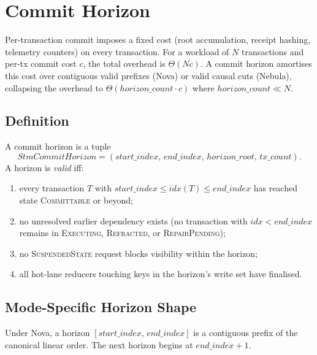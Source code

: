 \section{Commit Horizon}

\label{sec:horizon}

Per-transaction commit imposes a fixed cost (root accumulation,
receipt hashing, telemetry counters) on every transaction. For a
workload of $N$ transactions and per-tx commit cost $c$, the total
overhead is $\Theta(Nc)$. A commit horizon amortises this cost over
contiguous valid prefixes (Nova) or valid causal cuts (Nebula),
collapsing the overhead to $\Theta(\mathit{horizon\_count} \cdot c)$
where $\mathit{horizon\_count} \ll N$.

\subsection{Definition}

\begin{definition}
\label{def:commit-horizon}
A commit horizon is a tuple
\[
\mathit{StmCommitHorizon} =
(\mathit{start\_index},\, \mathit{end\_index},\,
 \mathit{horizon\_root},\, \mathit{tx\_count}).
\]
A horizon is \emph{valid} iff:
\begin{enumerate}[leftmargin=2em,nosep]
\item every transaction $T$ with $\mathit{start\_index} \leq
      \mathit{idx}(T) \leq \mathit{end\_index}$ has reached state
      \textsc{Committable} or beyond;
\item no unresolved earlier dependency exists (no transaction with
      $\mathit{idx} < \mathit{end\_index}$ remains in
      \textsc{Executing}, \textsc{Refracted}, or
      \textsc{RepairPending});
\item no \textsc{SuspendedState} request blocks visibility within
      the horizon;
\item all hot-lane reducers touching keys in the horizon's write set
      have finalised.
\end{enumerate}
\end{definition}

\subsection{Mode-Specific Horizon Shape}

\begin{definition}
\label{def:nova-horizon}
Under Nova, a horizon
$[\mathit{start\_index},\, \mathit{end\_index}]$ is a contiguous
prefix of the canonical linear order. The next horizon begins at
$\mathit{end\_index} + 1$.
\end{definition}

